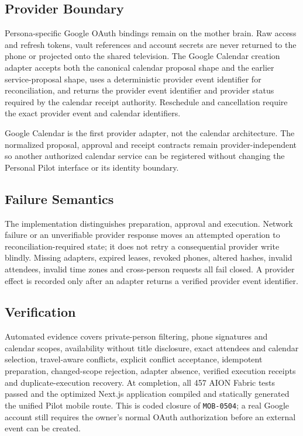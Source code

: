 \subsection{Provider Boundary}

Persona-specific Google OAuth bindings remain on the mother brain.  Raw access and refresh tokens,
vault references and account secrets are never returned to the phone or projected onto the shared
television.  The Google Calendar creation adapter accepts both the canonical calendar proposal
shape and the earlier service-proposal shape, uses a deterministic provider event identifier for
reconciliation, and returns the provider event identifier and provider status required by the
calendar receipt authority.  Reschedule and cancellation require the exact provider event and
calendar identifiers.

Google Calendar is the first provider adapter, not the calendar architecture.  The normalized
proposal, approval and receipt contracts remain provider-independent so another authorized
calendar service can be registered without changing the Personal Pilot interface or its identity
boundary.

\subsection{Failure Semantics}

The implementation distinguishes preparation, approval and execution.  Network failure or an
unverifiable provider response moves an attempted operation to reconciliation-required state; it
does not retry a consequential provider write blindly.  Missing adapters, expired leases, revoked
phones, altered hashes, invalid attendees, invalid time zones and cross-person requests all fail
closed.  A provider effect is recorded only after an adapter returns a verified provider event
identifier.

\subsection{Verification}

Automated evidence covers private-person filtering, phone signatures and calendar scopes,
availability without title disclosure, exact attendees and calendar selection, travel-aware
conflicts, explicit conflict acceptance, idempotent preparation, changed-scope rejection,
adapter absence, verified execution receipts and duplicate-execution recovery.  At completion,
all 457 AION Fabric tests passed and the optimized Next.js application compiled and statically
generated the unified Pilot mobile route.  This is coded closure of \texttt{MOB-0504}; a real
Google account still requires the owner's normal OAuth authorization before an external event can
be created.
